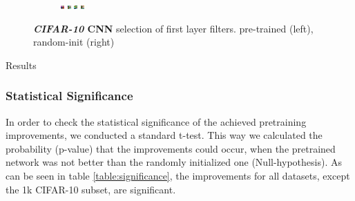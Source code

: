\documentclass{article}
\begin{document}
\begin{figure}
\begin{subfigure}{.4\linewidth}
              \includegraphics[width=0.1\linewidth]{../graphics/cifar_filters/random_15.png}
              \includegraphics[width=0.1\linewidth]{../graphics/cifar_filters/random_16.png} %
              \includegraphics[width=0.1\linewidth]{../graphics/cifar_filters/random_17.png} %
              \includegraphics[width=0.1\linewidth]{../graphics/cifar_filters/random_18.png}
            \end{subfigure}

          \caption{\textbf{\emph{CIFAR-10} CNN} selection of first layer filters. pre-trained (left), random-init (right)}
          \label{fig:cifar_filters}

      \end{figure}Results



  \subsubsection{Statistical Significance}
    In order to check the statistical significance of the achieved pretraining improvements, we conducted a standard t-test.
    This way we calculated the probability (p-value) that the improvements could occur, when the pretrained network was not better than the randomly initialized one (Null-hypothesis).
    As can be seen in table \ref{table:significance}, the improvements for all datasets, except the 1k CIFAR-10 subset, are significant.
\end{document}
